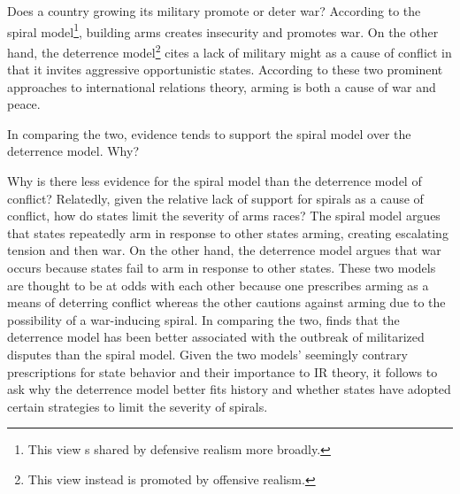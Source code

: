 \documentclass[12pt]{article}
\begin{document}
Does a country growing its military promote or deter war? According to the spiral model\footnote{This view s shared by defensive realism more broadly.}, building arms creates insecurity and promotes war. On the other hand, the deterrence model\footnote{This view instead is promoted by offensive realism.} cites a lack of military might as a cause of conflict in that it invites aggressive opportunistic states. According to these two prominent approaches to international relations theory, arming is both a cause of war and peace.

In comparing the two, evidence tends to support the spiral model over the deterrence model. Why?

Why is there less evidence for the spiral model than the deterrence model of conflict? Relatedly, given the relative lack of support for spirals as a cause of conflict, how do states limit the severity of arms races? The spiral model argues that states repeatedly arm in response to other states arming, creating escalating tension and then war. \citep[e.g.][]{downs1985, jervis1978, powell1993} On the other hand, the deterrence model argues that war occurs because states fail to arm in response to other states. \citep[e.g.][]{achen1989, huth1993} These two models are thought to be at odds with each other because one prescribes arming as a means of deterring conflict whereas the other cautions against arming due to the possibility of a war-inducing spiral. In comparing the two, \citet{braumoeller2008} finds that the deterrence model has been better associated with the outbreak of militarized disputes than the spiral model. Given the two models' seemingly contrary prescriptions for state behavior and their importance to IR theory, it follows to ask why the deterrence model better fits history and whether states have adopted certain strategies to limit the severity of spirals.


\singlespacing



\end{document}
